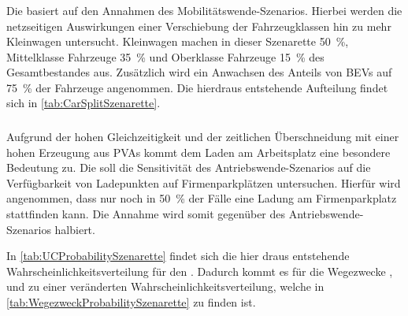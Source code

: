 \subsubsection{\Kleinwagendot}

Die \Kleinwagen basiert auf den Annahmen des Mobilitätswende-Szenarios.
Hierbei werden die netzseitigen Auswirkungen einer Verschiebung der Fahrzeugklassen hin zu mehr Kleinwagen untersucht.
Kleinwagen machen in dieser Szenarette \SI{50}{\percent}, Mittelklasse Fahrzeuge \SI{35}{\percent} und Oberklasse Fahrzeuge \SI{15}{\percent} des Gesamtbestandes aus.
Zusätzlich wird ein Anwachsen des Anteils von \glspl{BEV} auf \SI{75}{\percent} der Fahrzeuge angenommen.
Die hierdraus entstehende Aufteilung findet sich in \autoref{tab:CarSplitSzenarette}.




\subsubsection{\SzeFirmenparkplatzdot}

Aufgrund der hohen Gleichzeitigkeit und der zeitlichen Überschneidung mit einer hohen Erzeugung aus \glspl{PVA} kommt dem Laden am Arbeitsplatz eine besondere Bedeutung zu.
Die \SzeFirmenparkplatz soll die Sensitivität des Antriebswende-Szenarios auf die Verfügbarkeit von Ladepunkten auf Firmenparkplätzen untersuchen.
Hierfür wird angenommen, dass nur noch in \SI{50}{\percent} der Fälle eine Ladung am Firmenparkplatz stattfinden kann.
Die Annahme wird somit gegenüber des Antriebswende-Szenarios halbiert.



In \autoref{tab:UCProbabilitySzenarette} findet sich die hier draus entstehende Wahrscheinlichkeitsverteilung für den \UC \Firmeparkplatzdot.
Dadurch kommt es für die Wegezwecke \Arbeitdot, \dienst und \Ausbildung zu einer veränderten Wahrscheinlichkeitsverteilung, welche in \autoref{tab:WegezweckProbabilitySzenarette} zu finden ist.

